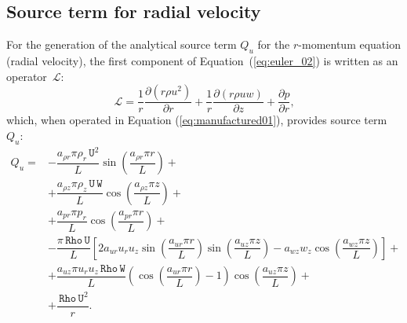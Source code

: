 \documentclass[10pt]{article}
\newcommand{\Diff}[2] {\dfrac{\partial( #1)}{\partial #2}}
\newcommand{\diff}[2] {\dfrac{\partial #1}{\partial #2}}
\newcommand{\Lo}{\,\mathcal{L}}
\newcommand{\Rho}{\,\mathtt{Rho}}
\newcommand{\U}{\,\mathtt{U}}
\newcommand{\W}{\,\mathtt{W}}
\begin{document}
\subsection{Source term for radial velocity}

For the generation of the analytical source term $Q_u$ for the $r$-momentum equation (radial velocity), the first component of Equation~(\ref{eq:euler_02}) is written as an  operator $\Lo$:
\begin{equation*}
 \Lo= \dfrac{1}{r}\Diff{r \rho u^2 }{r}+ \dfrac{1}{r}\Diff{r \rho u w}{z}+\diff{p}{r},
\end{equation*}
which, when operated in Equation (\ref{eq:manufactured01}), provides source term $Q_{u}$:
\begin{equation}
 \begin{split}
 \displaystyle
Q_u  =
&-\dfrac{a_{\rho r} \pi \rho_r \U^2 }{L}\sin\left(\dfrac{a_{\rho r} \pi r}{L}\right)+ \\
&+\dfrac{a_{\rho z} \pi \rho_z \U \W }{L}\cos\left(\dfrac{a_{\rho z} \pi z}{L}\right)+ \\
&+\dfrac{a_{pr} \pi p_r }{L}\cos\left(\dfrac{a_{pr} \pi r}{L}\right)+ \\
&-\dfrac{\pi \Rho \U}{L}\left[2 a_{ur} u_r u_z \sin\left(\dfrac{a_{ur} \pi r}{L}\right) \sin\left(\dfrac{a_{uz} \pi z}{L}\right)-a_{wz} w_z \cos\left(\dfrac{a_{wz} \pi z}{L}\right)\right] + \\
&+\dfrac{a_{uz} \pi u_r u_z \Rho \W}{L}\left( \cos\left(\dfrac{a_{ur} \pi r}{L}\right) -1 \right)  \cos\left(\dfrac{a_{uz} \pi z}{L}\right)+ \\
&+\dfrac{\Rho \U^2}{r}  .
\end{split}
\end{equation}
%
\end{document}
